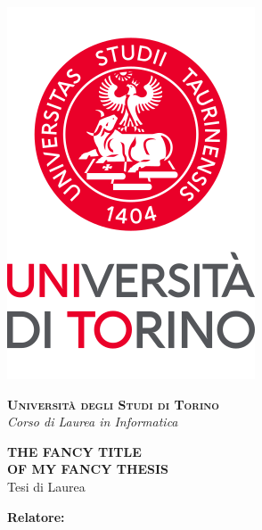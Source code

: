 \begin{titlepage}

    \begin{center}
        \includegraphics[scale=.3]{head/logo.png}
    \end{center}
    \begin{center}
        \vspace{20mm}
        {{\Large{\textsc{\bf Universit\`a degli Studi di Torino \\} \vspace{2mm} \emph{Corso di Laurea in Informatica}}}}
        \vspace{5mm}
    \end{center}
    \begin{center}
        \vspace{5mm}
        {\LARGE{\bf THE FANCY TITLE\\ OF MY FANCY THESIS\\}}
        \vspace{3mm}
        {\large{Tesi di Laurea\\}}
    \end{center}
    \vspace{20mm}
    \par
    \noindent
    \begin{minipage}[t]{0.47\textwidth}
        {\large{\bf Relatore:}\\
}
\end{minipage}
\end{titlepage}
